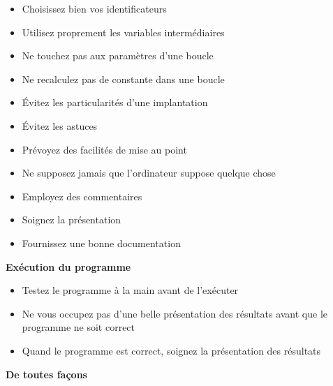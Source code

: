{\begin{multicols}{2}
\begin{description}
\begin{itemize}
\item Choisissez bien vos identificateurs

\item Utilisez proprement
les variables interm\'ediaires

\item Ne touchez pas aux param\`etres d'une boucle

\item Ne recalculez pas
de constante dans une boucle

\item \'Evitez les particularit\'es d'une implantation

\item \'Evitez les astuces 

\item Pr\'evoyez des facilit\'es de mise au point

\item Ne supposez jamais que l'ordinateur
suppose quelque chose

\item Employez des commentaires

\item Soignez la pr\'esentation

\item Fournissez une bonne documentation

\end{itemize}

\item {\normalsize  {\bf Ex\'ecution du programme}}

\begin{itemize}

\item Testez le programme \`a la main avant de l'ex\'ecuter

\item Ne vous occupez pas d'une belle
pr\'esentation des r\'esultats
avant que le programme ne soit correct

\item Quand le programme est correct,
soignez la pr\'esentation des r\'esultats

\end{itemize}

\item {\normalsize {\bf De toutes fa\c cons}}

\begin{itemize}


\end{itemize}
\end{description}
\end{multicols}}
